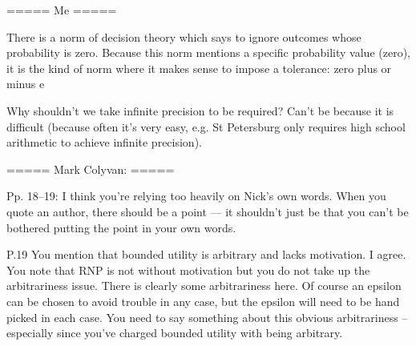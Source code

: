 =====
Me
=====

There is a norm of decision theory which says to ignore outcomes whose probability is zero. Because this norm mentions a specific probability value (zero), it is the kind of norm where it makes sense to impose a tolerance: zero plus or minus e

Why shouldn't we take infinite precision to be required? Can't be because it is difficult (because often it's very easy, e.g. St Petersburg only requires high school arithmetic to achieve infinite precision).

=====
Mark Colyvan:
=====

Pp. 18--19: I think you're relying too heavily on Nick's own words. When you quote an author, there should be a point --- it shouldn't just be that you can't be bothered putting the point in your own words.

P.19 You mention that bounded utility is arbitrary and lacks motivation. I agree. You note that RNP is not without motivation but you do not take up the arbitrariness issue. There is clearly some arbitrariness here. Of course an epsilon can be chosen to avoid trouble in any case, but the epsilon will need to be hand picked in each case. You need to say something about this obvious arbitrariness -- especially since you've charged bounded utility with being arbitrary.